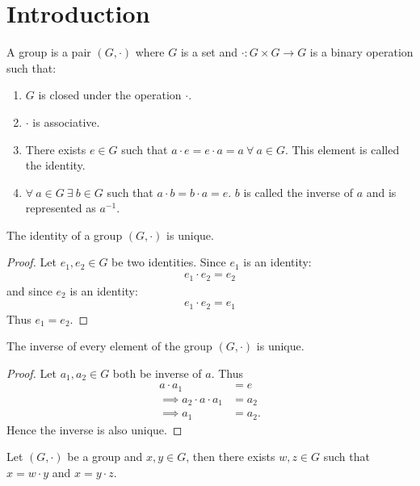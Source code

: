 \section{Introduction}
\begin{definition}
  A group is a pair $(G, \cdot)$ where $G$ is a set and $\cdot: G\times G\to G$ is a binary operation such that:
  \begin{enumerate}
    \item $G$ is closed under the operation $\cdot$.
    \item $\cdot$ is associative.
    \item There exists $e\in G$ such that $a\cdot e = e\cdot a = a\ \forall\ a\in G$. This element is called the identity. 
    \item $\forall\ a\in G\ \exists\ b\in G$ such that $a\cdot b = b\cdot a =e$. $b$ is called the inverse of $a$ and is represented as $a^{-1}$. 
  \end{enumerate}
\end{definition}
\begin{proposition}
  The identity of a group $(G,\cdot)$ is unique.
\end{proposition}
\begin{proof}
  Let $e_1, e_2\in G$ be two identities. Since $e_1$ is an identity:
  \begin{align*}
    e_1\cdot e_2 = e_2 
  \end{align*}
  and since $e_2$ is an identity:
  \begin{align*}
    e_1\cdot e_2 = e_1
  \end{align*}
  Thus $e_1 = e_2$.
\end{proof}
\begin{proposition}
  The inverse of every element of the group $(G,\cdot)$ is unique.
\end{proposition}
\begin{proof}
  Let $a_1, a_2\in G$ both be inverse of $a$. Thus
  \begin{align*}
    a\cdot a_1 &= e\\
    \implies a_2\cdot a\cdot a_1 &= a_2\\
    \implies a_1 &= a_2.
  \end{align*}
  Hence the inverse is also unique. 
\end{proof}
\begin{proposition}
  Let $(G,\cdot)$ be a group and $x,y\in G$, then there exists $w,z\in G$ such that $x = w\cdot y$ and $x = y\cdot z$.
\end{proposition}
